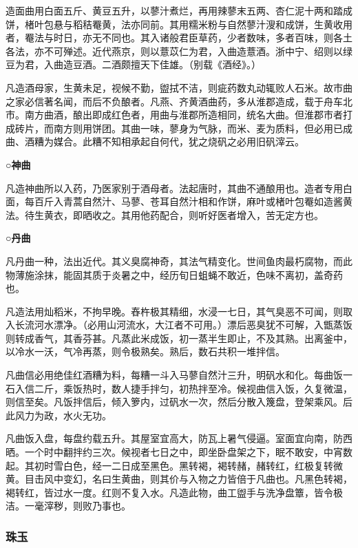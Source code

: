 \documentclass[]{article}
\begin{document}
造面曲用白面五斤、黄豆五升，以蓼汁煮烂，再用辣蓼末五两、杏仁泥十两和踏成饼，楮叶包悬与稻秸罨黄，法亦同前。其用糯米粉与自然蓼汁溲和成饼，生黄收用者，罨法与时日，亦无不同也。其入诸般君臣草药，少者数味，多者百味，则各土各法，亦不可殚述。近代燕京，则以薏苡仁为君，入曲造薏酒。浙中宁、绍则以绿豆为君，入曲造豆酒。二酒颇擅天下佳雄。（别载《酒经》。）

凡造酒母家，生黄未足，视候不勤，盥拭不洁，则疵药数丸动辄败人石米。故市曲之家必信著名闻，而后不负酿者。凡燕、齐黄酒曲药，多从淮郡造成，载于舟车北市。南方曲酒，酿出即成红色者，用曲与淮郡所造相同，统名大曲。但淮郡市者打成砖片，而南方则用饼团。其曲一味，蓼身为气脉，而米、麦为质料，但必用已成曲、酒糟为媒合。此糟不知相承起自何代，犹之烧矾之必用旧矾滓云。

\textbf{○神曲}

凡造神曲所以入药，乃医家别于酒母者。法起唐时，其曲不通酿用也。造者专用白面，每百斤入青蒿自然汁、马蓼、苍耳自然汁相和作饼，麻叶或楮叶包罨如造酱黄法。待生黄衣，即晒收之。其用他药配合，则听好医者增入，苦无定方也。

\textbf{○丹曲}

凡丹曲一种，法出近代。其义臭腐神奇，其法气精变化。世间鱼肉最朽腐物，而此物薄施涂抹，能固其质于炎暑之中，经历旬日蛆蝇不敢近，色味不离初，盖奇药也。

凡造法用灿稻米，不拘早晚。舂杵极其精细，水浸一七日，其气臭恶不可闻，则取入长流河水漂净。（必用山河流水，大江者不可用。）漂后恶臭犹不可解，入甑蒸饭则转成香气，其香芬甚。凡蒸此米成饭，初一蒸半生即止，不及其熟。出离釜中，以冷水一沃，气冷再蒸，则令极熟矣。熟后，数石共积一堆拌信。

凡曲信必用绝佳红酒糟为料，每糟一斗入马蓼自然汁三升，明矾水和化。每曲饭一石入信二斤，乘饭热时，数人捷手拌匀，初热拌至冷。候视曲信入饭，久复微温，则信至矣。凡饭拌信后，倾入箩内，过矾水一次，然后分散入篾盘，登架乘风。后此风力为政，水火无功。

凡曲饭入盘，每盘约载五升。其屋室宜高大，防瓦上暑气侵逼。室面宜向南，防西晒。一个时中翻拌约三次。候视者七日之中，即坐卧盘架之下，眠不敢安，中宵数起。其初时雪白色，经一二日成至黑色。黑转褐，褐转赭，赭转红，红极复转微黄。目击风中变幻，名曰生黄曲，则其价与入物之力皆倍于凡曲也。凡黑色转褐，褐转红，皆过水一度。红则不复入水。凡造此物，曲工盥手与洗净盘簟，皆令极洁。一毫滓秽，则败乃事也。

\hypertarget{header-n2788}{%
\subsubsection{珠玉}\label{header-n2788}}
\end{document}
